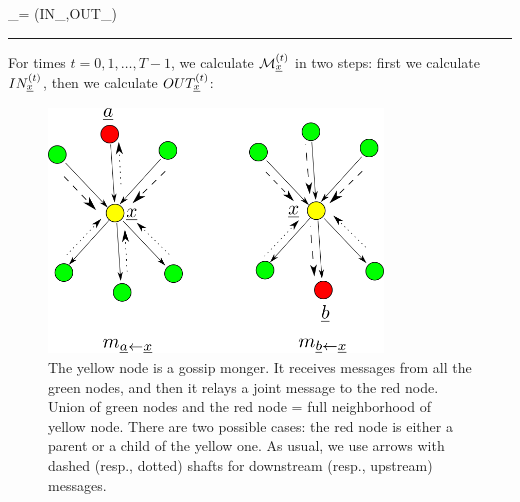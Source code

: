 \beq
\calm_\rvx =
(IN_\rvx,OUT_\rvx)
\eeq

\hrule

For times $t=0, 1, \dots, T-1$,
 we calculate ${\cal M}^{(t)}_{\underline{x}}$ in
two steps: first we calculate $IN^{(t)}_{\underline{x}}$,
 then
we calculate $OUT^{(t)}_{\underline{x}}$:

\begin{figure}[h!]
\centering
\includegraphics[width=3.5in]
{mpass/mpass-messages.png}
\caption{The yellow
node is a gossip monger.
It receives messages from
all the green nodes,
and then it relays a joint
message to the red node.
Union of green nodes and the red node = full
 neighborhood of yellow node.
There are two possible 
cases: the
red node is either a parent 
or a child of the yellow 
one. As usual, we use arrows with
dashed (resp., dotted) shafts for
downstream (resp., upstream) messages.  } 
\label{fig-messages-gen}
\end{figure}



